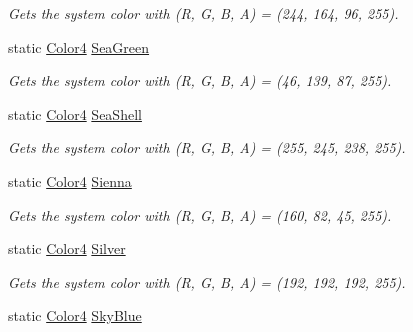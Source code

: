 \begin{DoxyCompactItemize}
\begin{DoxyCompactList}\small\item\em Gets the system color with (R, G, B, A) = (244, 164, 96, 255). \end{DoxyCompactList}\item 
static \hyperlink{struct_open_t_k_1_1_graphics_1_1_color4}{Color4} \hyperlink{struct_open_t_k_1_1_graphics_1_1_color4_a325f9f125ad6b954aa03a3d828d3ec34}{Sea\-Green}
\begin{DoxyCompactList}\small\item\em Gets the system color with (R, G, B, A) = (46, 139, 87, 255). \end{DoxyCompactList}\item 
static \hyperlink{struct_open_t_k_1_1_graphics_1_1_color4}{Color4} \hyperlink{struct_open_t_k_1_1_graphics_1_1_color4_a379276906d30abe656c1b68679fbe7ef}{Sea\-Shell}
\begin{DoxyCompactList}\small\item\em Gets the system color with (R, G, B, A) = (255, 245, 238, 255). \end{DoxyCompactList}\item 
static \hyperlink{struct_open_t_k_1_1_graphics_1_1_color4}{Color4} \hyperlink{struct_open_t_k_1_1_graphics_1_1_color4_a9824cec7208b40f90c8e9826bef33c32}{Sienna}
\begin{DoxyCompactList}\small\item\em Gets the system color with (R, G, B, A) = (160, 82, 45, 255). \end{DoxyCompactList}\item 
static \hyperlink{struct_open_t_k_1_1_graphics_1_1_color4}{Color4} \hyperlink{struct_open_t_k_1_1_graphics_1_1_color4_a5d234ac7486cf582beba1c0dc06b7655}{Silver}
\begin{DoxyCompactList}\small\item\em Gets the system color with (R, G, B, A) = (192, 192, 192, 255). \end{DoxyCompactList}\item 
static \hyperlink{struct_open_t_k_1_1_graphics_1_1_color4}{Color4} \hyperlink{struct_open_t_k_1_1_graphics_1_1_color4_a28948dcbffbf068441050a57616a9ef3}{Sky\-Blue}

\end{DoxyCompactItemize}
